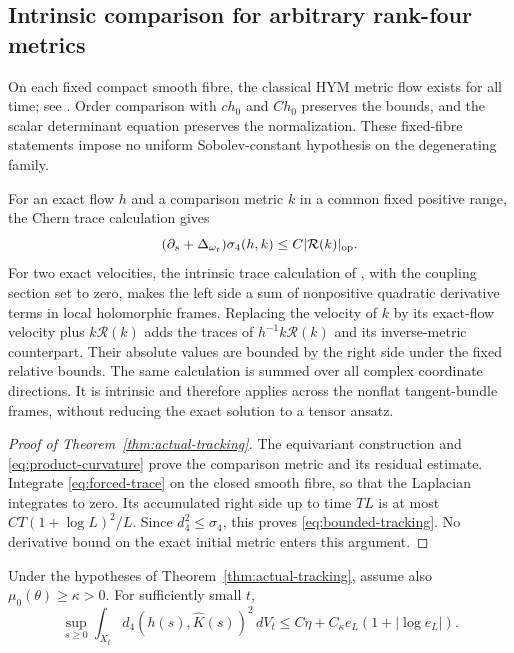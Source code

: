 \subsection{Intrinsic comparison for arbitrary rank-four metrics}
On each fixed compact smooth fibre, the classical HYM metric flow
exists for all time; see \cite[Section 4.1, after (4.8)]{hkkp}.
Order comparison \cite[Proposition 4.3]{hkkp}
with $ch_0$ and $Ch_0$ preserves
the bounds, and the scalar determinant equation preserves the
normalization. These fixed-fibre statements impose no uniform
Sobolev-constant hypothesis on the degenerating family.

For an exact flow $h$ and a comparison metric $k$ in a common fixed
positive range, the Chern trace calculation gives
\begin{equation}\label{eq:forced-trace}
 (\partial_s+\Delta_{\omega_t})\sigma_4(h,k)
                \le C|\mathcal R(k)|_{\mathrm{op}}.
\end{equation}
For two exact velocities, the intrinsic trace calculation of
\cite[Proposition 2.4]{wang}, with the coupling section set to zero,
makes the left side a sum of nonpositive
quadratic derivative terms in local holomorphic frames. Replacing the
velocity of $k$ by its exact-flow velocity plus $k\mathcal R(k)$
adds the traces of $h^{-1}k\mathcal R(k)$ and its inverse-metric
counterpart. Their absolute values are bounded by the right side
under the fixed relative bounds. The same calculation is summed over
all complex coordinate directions. It is intrinsic and therefore
applies across the nonflat tangent-bundle frames, without reducing
the exact solution to a tensor ansatz.

\begin{proof}[Proof of Theorem~\ref{thm:actual-tracking}]
The equivariant construction and \eqref{eq:product-curvature} prove
the comparison metric and its residual estimate. Integrate
\eqref{eq:forced-trace} on the closed smooth fibre, so that the
Laplacian integrates to zero. Its accumulated right side up to time
$TL$ is at most $CT(1+\log L)^2/L$. Since $d_4^2\le\sigma_4$,
this proves \eqref{eq:bounded-tracking}. No derivative bound on
the exact initial metric enters this argument.
\end{proof}

\begin{theorem}\label{thm:all-time}
Under the hypotheses of Theorem~\ref{thm:actual-tracking}, assume also
$\mu_0(\theta)\ge\kappa>0$. For sufficiently small $t$,
\begin{equation}\label{eq:all-time}
 \sup_{s\ge0}\int_{X_t}d_4(h(s),\widehat K(s))^2\,dV_t
       \le C\eta+C_\kappa e_L(1+|\log e_L|).
\end{equation}
\end{theorem}

